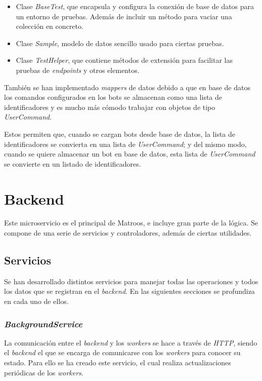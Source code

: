 \begin{itemize}
	\item Clase \textit{BaseTest}, que encapsula y configura la conexión de base de datos para un entorno de pruebas. Además de incluir un método para vaciar una colección en concreto.
	\item Clase \textit{Sample}, modelo de datos sencillo usado para ciertas pruebas.
	\item Clase \textit{TestHelper}, que contiene métodos de extensión para facilitar las pruebas de \textit{endpoints} y otros elementos.
\end{itemize}

También se han implementado \textit{mappers} de datos debido a que en base de datos los comandos configurados en los bots se almacenan como una lista de identificadores y es mucho más cómodo trabajar con objetos de tipo \textit{UserCommand}.

Estos permiten que, cuando se cargan bots desde base de datos, la lista de identificadores se convierta en una lista de \textit{UserCommand}; y del mismo modo, cuando se quiere almacenar un bot en base de datos, esta lista de \textit{UserCommand} se convierte en un listado de identificadores.




\section{Backend}

Este microservicio es el principal de Matroos, e incluye gran parte de la lógica. Se compone de una serie de servicios y controladores, además de ciertas utilidades.

\subsection{Servicios}

Se han desarrollado distintos servicios para manejar todas las operaciones y todos los datos que se registran en el \textit{backend}. En las siguientes secciones se profundiza en cada uno de ellos.

\subsubsection{\textit{BackgroundService}}

La comunicación entre el \textit{backend} y los \textit{workers} se hace a través de \textit{HTTP}, siendo el \textit{backend} el que se encarga de comunicarse con los \textit{workers} para conocer su estado. Para ello se ha creado este servicio, el cual realiza actualizaciones periódicas de los \textit{workers}.

